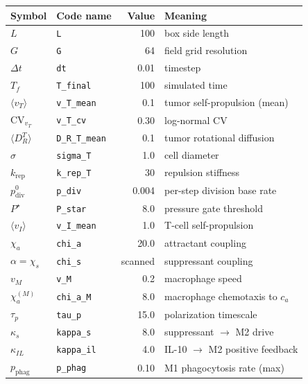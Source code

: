\documentclass[11pt,letterpaper]{article}
\begin{document}
\begin{center}\small
\begin{tabular}{l l r l}
\toprule
Symbol & Code name & Value & Meaning \\
\midrule
$L$            & \texttt{L}            & 100      & box side length \\
$G$            & \texttt{G}            & 64       & field grid resolution \\
$\Delta t$     & \texttt{dt}           & 0.01     & timestep \\
$T_f$          & \texttt{T\_final}     & 100      & simulated time \\
\midrule
$\langle v_T \rangle$ & \texttt{v\_T\_mean} & 0.1 & tumor self-propulsion (mean) \\
$\mathrm{CV}_{v_T}$   & \texttt{v\_T\_cv}   & 0.30 & log-normal CV \\
$\langle D_R^T \rangle$ & \texttt{D\_R\_T\_mean} & 0.1 & tumor rotational diffusion \\
$\sigma$       & \texttt{sigma\_T}     & 1.0      & cell diameter \\
$k_{\text{rep}}$ & \texttt{k\_rep\_T}  & 30       & repulsion stiffness \\
$p_{\text{div}}^{0}$ & \texttt{p\_div} & 0.004    & per-step division base rate \\
$P^\star$      & \texttt{P\_star}      & 8.0      & pressure gate threshold \\
\midrule
$\langle v_I \rangle$ & \texttt{v\_I\_mean} & 1.0 & T-cell self-propulsion \\
$\chi_a$       & \texttt{chi\_a}       & 20.0     & attractant coupling \\
$\alpha = \chi_s$ & \texttt{chi\_s}    & scanned  & suppressant coupling \\
\midrule
$v_M$          & \texttt{v\_M}         & 0.2      & macrophage speed \\
$\chi_a^{(M)}$ & \texttt{chi\_a\_M}    & 8.0      & macrophage chemotaxis to $c_a$ \\
$\tau_p$       & \texttt{tau\_p}       & 15.0     & polarization timescale \\
$\kappa_s$     & \texttt{kappa\_s}     & 8.0      & suppressant $\to$ M2 drive \\
$\kappa_{IL}$  & \texttt{kappa\_il}    & 4.0      & IL-10 $\to$ M2 positive feedback \\
$p_{\text{phag}}$ & \texttt{p\_phag}   & 0.10     & M1 phagocytosis rate (max) \\
\midrule

\end{tabular}
\end{center}
\end{document}
